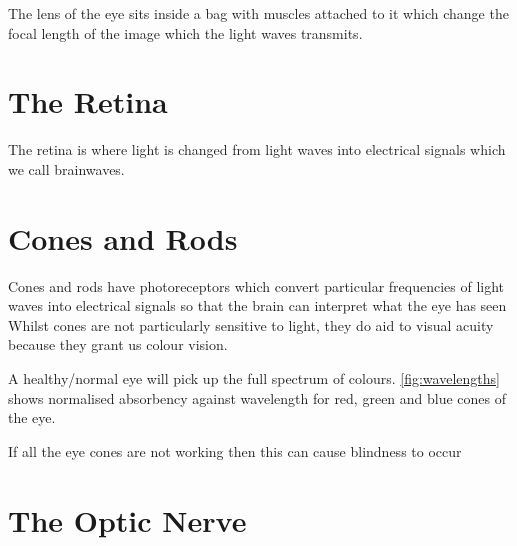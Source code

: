 The lens of the eye sits inside a bag with muscles attached to it which
change the focal length of the image which the light waves transmits.

\section{The Retina}
The retina is where light is changed from light waves into electrical signals
which we call brainwaves.

\section{Cones and Rods}

Cones and rods have photoreceptors which convert particular frequencies of
light waves into electrical signals so that the brain can interpret what
the eye has seen Whilst cones are not particularly sensitive to light,
they do aid to visual acuity because they grant us colour vision.\cite{}

A healthy/normal eye will pick up the full spectrum of colours.
\ref{fig:wavelengths} shows normalised absorbency against wavelength for red,
green and blue cones of the eye.

If all the eye cones are not working then this can cause blindness to occur\cite{}

\section{The Optic Nerve}

